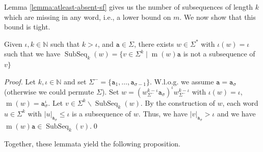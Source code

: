 \documentclass[runningheads,UKenglish,cleveref, autoref, thm-restate]{llncs}
\newcommand{\N}{\mathbb{N}}
\def\ta{\mathtt{a}}
\def\m{\operatorname{m}}
\DeclareMathOperator\ScatFact{SubSeq}
\newif\ifpaper
\begin{document}

\ifpaper
\else
Lemma \ref{lemma:atleast-absent-sf} gives us the number of subsequences of length $k$ which are missing in any word, i.e., a lower bound on $m$. We now show that this bound is tight.%
\fi


\ifpaper
\else
\begin{lemma}\label{lemma:min-absent-sf-strucure}
    Given $\iota,k\in\N$ such that $k > \iota$, and $\ta\in\Sigma$, there exists $w\in\Sigma^*$ with $\iota(w) = \iota$ such that we have $\ScatFact_k(w)=\{v\in \Sigma^k\mid \m(w)\ta$ is not a subsequence of $v\}$
\end{lemma}

\begin{proof}
Let $k,\iota\in\N$ and set $\Sigma^-=\{\ta_1,\ldots,\ta_{\sigma-1}\}$. W.l.o.g. we assume $\ta=\ta_{\sigma}$ (otherwise we could permute $\Sigma$).
    Set $w = (w_{\Sigma^-}^{k-\iota}\ta_\sigma)^{\iota}w_{\Sigma^-}^{k-\iota}$ with $\iota(w)=\iota$, $\m(w)=\ta_{\sigma}^{\iota}$. 
    Let $v\in\Sigma^k\backslash\ScatFact_k(w)$. By the construction of $w$, each word $u\in\Sigma^k$ with $|u|_{\ta_{\sigma}}\leq\iota$ is a subsequence of $w$. Thus, we have $|v|_{\ta_{\sigma}}>\iota$ and we have $\m(w)\ta\in\ScatFact_k(v)$.\qed
\end{proof}

\fi

\ifpaper
\else
Together, these lemmata yield the following proposition.
\fi
\end{document}
